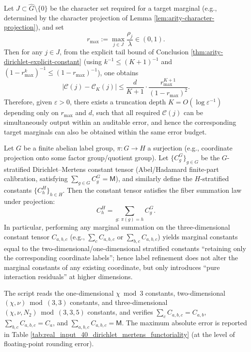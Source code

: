 \begin{remark}\label{rem:arity-dirichlet-explicit-constant-truncation-depth}
Let \(J\subset \widehat G\setminus\{0\}\) be the character set required for a target marginal (e.g., determined by the character projection of Lemma \ref{lem:arity-character-projection}), and set
\[
r_{\max}:=\max_{j\in J}\frac{\rho_j}{\lambda}\in(0,1).
\]
Then for any \(j\in J\), from the explicit tail bound of Conclusion \ref{thm:arity-dirichlet-explicit-constant} (using \(k^{-1}\le (K+1)^{-1}\) and \((1-r_{\max}^k)^{-1}\le (1-r_{\max})^{-1}\)), one obtains
\[
\bigl|\mathcal{C}(j)-\mathcal{C}_K(j)\bigr|
\le
\frac{d}{K+1}\cdot\frac{r_{\max}^{K+1}}{(1-r_{\max})^2}.
\]
Therefore, given \(\varepsilon>0\), there exists a truncation depth \(K=O(\log\varepsilon^{-1})\) depending only on \(r_{\max}\) and \(d\), such that all required \(\mathcal{C}(j)\) can be simultaneously output within an auditable error, and hence the corresponding target marginals can also be obtained within the same error budget.
\end{remark}

\begin{remark}\label{thm:dirichlet-mertens-functoriality}
Let \(G\) be a finite abelian label group, \(\pi:G\to H\) a surjection (e.g., coordinate projection onto some factor group/quotient group). Let
\(\{C^G_g\}_{g\in G}\) be the \(G\)-stratified Dirichlet--Mertens constant tensor (Abel/Hadamard finite-part calibration, satisfying \(\sum_{g\in G}C^G_g=\mathsf{M}\)), and similarly define the \(H\)-stratified constants \(\{C^H_h\}_{h\in H}\).
Then the constant tensor satisfies the fiber summation law under projection:
\[
C^H_h=\sum_{g:\ \pi(g)=h}C^G_g.
\]
In particular, performing any marginal summation on the three-dimensional constant tensor \(C_{a,b,c}\) (e.g., \(\sum_c C_{a,b,c}\) or \(\sum_{b,c}C_{a,b,c}\)) yields marginal constants equal to the two-dimensional/one-dimensional stratified constants ``retaining only the corresponding coordinate labels''; hence label refinement does not alter the marginal constants of any existing coordinate, but only introduces ``pure interaction residuals'' at higher dimensions.
\end{remark}

\begin{remark}\label{rem:dirichlet-mertens-functoriality-check}
The script  reads the one-dimensional \(\chi\bmod 3\) constants, two-dimensional \((\chi,\nu)\bmod(3,3)\) constants, and three-dimensional \((\chi,\nu,N_2)\bmod(3,3,5)\) constants, and verifies
\(\sum_c C_{a,b,c}=C_{a,b}\), \(\sum_{b,c}C_{a,b,c}=C_a\), and \(\sum_{a,b,c}C_{a,b,c}=\mathsf{M}\).
The maximum absolute error is reported in Table \ref{tab:real_input_40_dirichlet_mertens_functoriality} (at the level of floating-point rounding error).
\end{remark}

